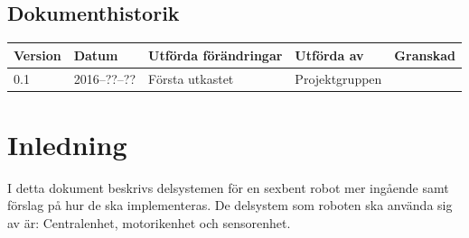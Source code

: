 \documentclass[a4paper,titlepage,12pt]{article}
\begin{document}
\begin{center}

		\section*{Dokumenthistorik}
		\renewcommand*{\arraystretch}{1.4}
		\begin{longtable}[c]{ l l l l l }
			\textbf{Version} & \textbf{Datum} & \textbf{Utförda förändringar} 
			& \textbf{Utförda av} & \textbf{Granskad} \\ \midrule
			
			0.1 & 2016--??--?? & Första utkastet & Projektgruppen & \\
		\end{longtable}
	\end{center}


	\newpage

	\section{Inledning}
	I detta dokument beskrivs delsystemen för en sexbent robot mer ingående samt förslag på hur de ska 
	implementeras. De delsystem som roboten ska använda sig av är:
	Centralenhet, motorikenhet och sensorenhet.

\end{document}
